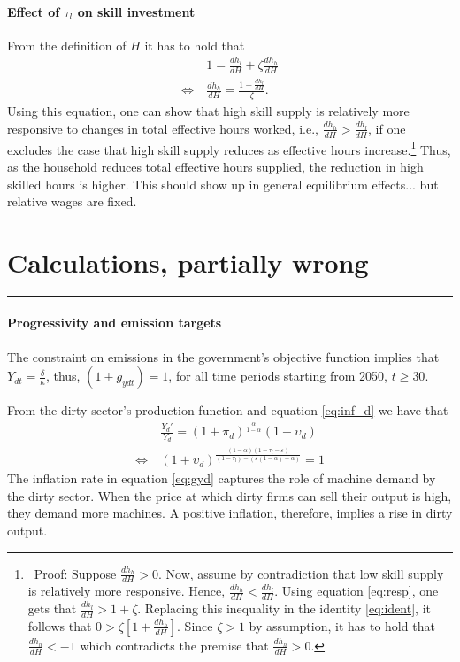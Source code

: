 \paragraph{Effect of $\tau_l$ on skill investment}
From the definition of $H$ it has to hold that 
\begin{align}
&1=\frac{dh_l}{dH}+\zeta \frac{dh_h}{dH}\label{eq:ident} \\
\Leftrightarrow\ & \frac{dh_h}{dH}=\frac{1-\frac{dh_l}{dH}}{\zeta}.\label{eq:resp}
\end{align}
Using this equation, one can show that high skill supply is relatively more responsive to changes in total effective hours worked, i.e.,  $\frac{dh_h}{dH}>\frac{dh_l}{dH}$, if one excludes the case that high skill supply reduces as effective hours increase.\footnote{\ Proof: Suppose   $\frac{dh_h}{dH}>0$. Now, assume by contradiction that low skill supply is relatively more responsive. Hence, $\frac{dh_h}{dH}<\frac{dh_l}{dH}$. Using equation \ref{eq:resp}, one gets that $\frac{dh_l}{dH}>1+\zeta$. Replacing this inequality in the identity \ref{eq:ident}, it follows that $0>\zeta[1+\frac{dh_h}{dH}]$. Since $\zeta>1$ by assumption, it has to hold that $\frac{dh_h}{dH}<-1$ which contradicts the premise that $\frac{dh_h}{dH}>0$. } Thus, as the household reduces total effective hours supplied, the reduction in high skilled hours is higher.  This should show up in general equilibrium effects... but relative wages are fixed. 


\section{Calculations, partially wrong}
\noindent\rule[1ex]{\textwidth}{1pt}

\paragraph{Progressivity and emission targets}
The constraint on emissions in the government's objective function implies that $Y_{dt}=\frac{\delta}{\kappa}$, thus, $(1+g_{ydt})=1$, for all time periods starting from 2050, $t\geq 30$. 

From the dirty sector's production function and equation \ref{eq:inf_d} we have that
\begin{align}
&\frac{Y_{d}'}{Y_d}=(1+\pi_d)^{\frac{\alpha}{1-\alpha}}(1+\upsilon_{d})\label{eq:gyd}\\
\Leftrightarrow\ &(1+\upsilon_{d})^{\frac{(1-\alpha)(1-\tau_l-\varepsilon)}{(1-\tau_l)-(\varepsilon(1-\alpha)+\alpha)}}=1\label{eq:def_taul}
\end{align}
The inflation rate in equation \ref{eq:gyd} captures the role of machine demand by the dirty sector. When the price at which dirty firms can sell their output is high, they demand more machines. A positive inflation, therefore, implies a rise in dirty output.


